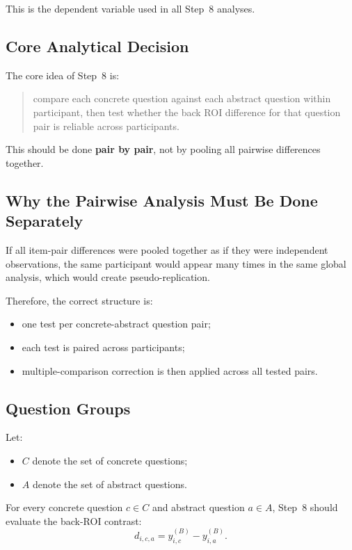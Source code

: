 This is the dependent variable used in all Step~8 analyses.

\subsection{Core Analytical Decision}
The core idea of Step~8 is:
\begin{quote}
compare each concrete question against each abstract question within participant,
then test whether the back ROI difference for that question pair is reliable across participants.
\end{quote}

This should be done \textbf{pair by pair}, not by pooling all pairwise differences together.

\subsection{Why the Pairwise Analysis Must Be Done Separately}
If all item-pair differences were pooled together as if they were independent observations,
the same participant would appear many times in the same global analysis, which would create
pseudo-replication.

Therefore, the correct structure is:
\begin{itemize}
    \item one test per concrete-abstract question pair;
    \item each test is paired across participants;
    \item multiple-comparison correction is then applied across all tested pairs.
\end{itemize}

\subsection{Question Groups}
Let:
\begin{itemize}
    \item \(C\) denote the set of concrete questions;
    \item \(A\) denote the set of abstract questions.
\end{itemize}

For every concrete question \(c \in C\) and abstract question \(a \in A\),
Step~8 should evaluate the back-ROI contrast:
\begin{equation}
d_{i,c,a} = y^{(B)}_{i,c} - y^{(B)}_{i,a}.
\end{equation}

